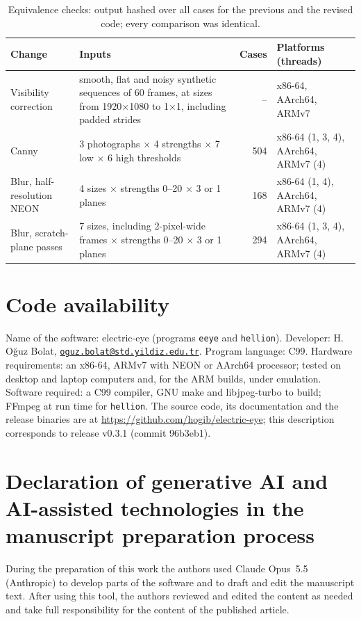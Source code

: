 \documentclass[a4paper,fleqn]{cas-sc}
\newcommand{\eeye}{\texttt{eeye}}
\newcommand{\hellion}{\texttt{hellion}}
\begin{document}
\begin{table}[pos=htbp]
  \centering\small
  \caption{Equivalence checks: output hashed over all cases for the previous and the
    revised code; every comparison was identical.}\label{tab:equivalence}
  \setlength{\tabcolsep}{4pt}
  \begin{tabular}{@{}L{3.6cm}L{6.2cm}rL{3.2cm}@{}}
    \toprule
    Change & Inputs & Cases & Platforms (threads) \\
    \midrule
    Visibility correction & smooth, flat and noisy synthetic sequences of 60 frames, at
      sizes from 1920$\times$1080 to 1$\times$1, including padded strides & -- & x86-64, AArch64, ARMv7 \\
    Canny & 3 photographs $\times$ 4 strengths $\times$ 7 low $\times$ 6 high thresholds & 504 & x86-64 (1, 3, 4), AArch64, ARMv7 (4) \\
    Blur, half-resolution NEON & 4 sizes $\times$ strengths 0--20 $\times$ 3 or 1 planes & 168 & x86-64 (1, 4), AArch64, ARMv7 (4) \\
    Blur, scratch-plane passes & 7 sizes, including 2-pixel-wide frames $\times$ strengths 0--20 $\times$ 3 or 1 planes & 294 & x86-64 (1, 3, 4), AArch64, ARMv7 (4) \\
    \bottomrule
  \end{tabular}
\end{table}

\section*{Code availability}

Name of the software: electric-eye (programs \eeye{} and \hellion{}). Developer:
H. O\u{g}uz Bolat, \href{mailto:oguz.bolat@std.yildiz.edu.tr}{\nolinkurl{oguz.bolat@std.yildiz.edu.tr}}.
Program language: C99. Hardware requirements: an x86-64, ARMv7 with NEON or AArch64 processor;
tested on desktop and laptop computers and, for the ARM builds, under emulation.
Software required: a C99 compiler, GNU make and libjpeg-turbo to build; FFmpeg at run
time for \hellion{}. The source code, its documentation and the release binaries are at
\url{https://github.com/hogib/electric-eye}; this description corresponds to release
v0.3.1 (commit 96b3eb1).

\section*{Declaration of generative AI and AI-assisted technologies in the manuscript preparation process}

During the preparation of this work the authors used Claude Opus~5.5 (Anthropic) to
develop parts of the software and to draft and edit the manuscript text. After using
this tool, the authors reviewed and edited the content as needed and take full
responsibility for the content of the published article.



\end{document}
